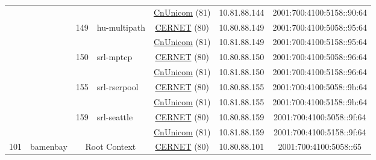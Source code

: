 \begin{small}
\begin{center}
\begin{longtable}{|c|c|c|c|c|c|c|c|}
  &  &  &  & \multicolumn{2}{|c|}{\tiny{\href{http://www.chinaunicom.com}{CnUnicom} (81)}} & \tiny{10.81.88.144} & \tiny{2001:700:4100:5158::90:64} \\* \cline{3-3}\cline{4-4}\cline{5-5}\cline{6-6}\cline{7-7}\cline{8-8}
  &  & \multirow{2}{*}{\tiny{149}} & \multicolumn{1}{|l|}{\multirow{2}{*}{\tiny{hu-multipath}}} & \multicolumn{2}{|c|}{\tiny{\href{http://www.cernet.edu.cn}{CERNET} (80)}} & \tiny{10.80.88.149} & \tiny{2001:700:4100:5058::95:64} \\* \cline{5-5}\cline{6-6}\cline{7-7}\cline{8-8}
  &  &  &  & \multicolumn{2}{|c|}{\tiny{\href{http://www.chinaunicom.com}{CnUnicom} (81)}} & \tiny{10.81.88.149} & \tiny{2001:700:4100:5158::95:64} \\* \cline{3-3}\cline{4-4}\cline{5-5}\cline{6-6}\cline{7-7}\cline{8-8}
  &  & \multirow{2}{*}{\tiny{150}} & \multicolumn{1}{|l|}{\multirow{2}{*}{\tiny{srl-mptcp}}} & \multicolumn{2}{|c|}{\tiny{\href{http://www.cernet.edu.cn}{CERNET} (80)}} & \tiny{10.80.88.150} & \tiny{2001:700:4100:5058::96:64} \\* \cline{5-5}\cline{6-6}\cline{7-7}\cline{8-8}
  &  &  &  & \multicolumn{2}{|c|}{\tiny{\href{http://www.chinaunicom.com}{CnUnicom} (81)}} & \tiny{10.81.88.150} & \tiny{2001:700:4100:5158::96:64} \\* \cline{3-3}\cline{4-4}\cline{5-5}\cline{6-6}\cline{7-7}\cline{8-8}
  &  & \multirow{2}{*}{\tiny{155}} & \multicolumn{1}{|l|}{\multirow{2}{*}{\tiny{srl-rserpool}}} & \multicolumn{2}{|c|}{\tiny{\href{http://www.cernet.edu.cn}{CERNET} (80)}} & \tiny{10.80.88.155} & \tiny{2001:700:4100:5058::9b:64} \\* \cline{5-5}\cline{6-6}\cline{7-7}\cline{8-8}
  &  &  &  & \multicolumn{2}{|c|}{\tiny{\href{http://www.chinaunicom.com}{CnUnicom} (81)}} & \tiny{10.81.88.155} & \tiny{2001:700:4100:5158::9b:64} \\* \cline{3-3}\cline{4-4}\cline{5-5}\cline{6-6}\cline{7-7}\cline{8-8}
  &  & \multirow{2}{*}{\tiny{159}} & \multicolumn{1}{|l|}{\multirow{2}{*}{\tiny{srl-seattle}}} & \multicolumn{2}{|c|}{\tiny{\href{http://www.cernet.edu.cn}{CERNET} (80)}} & \tiny{10.80.88.159} & \tiny{2001:700:4100:5058::9f:64} \\* \cline{5-5}\cline{6-6}\cline{7-7}\cline{8-8}
  &  &  &  & \multicolumn{2}{|c|}{\tiny{\href{http://www.chinaunicom.com}{CnUnicom} (81)}} & \tiny{10.81.88.159} & \tiny{2001:700:4100:5158::9f:64} \\ \hline
 \multirow{14}{*}{\tiny{101}} & \multicolumn{1}{|l|}{\multirow{14}{*}{\tiny{bamenbay}}} & \multicolumn{2}{|c|}{\multirow{2}{*}{\tiny{Root Context}}} & \multicolumn{2}{|c|}{\tiny{\href{http://www.cernet.edu.cn}{CERNET} (80)}} & \tiny{10.80.88.101} & \tiny{2001:700:4100:5058::65} \\* \cline{5-5}\cline{6-6}\cline{7-7}\cline{8-8}

\end{longtable}
\end{center}
\end{small}

